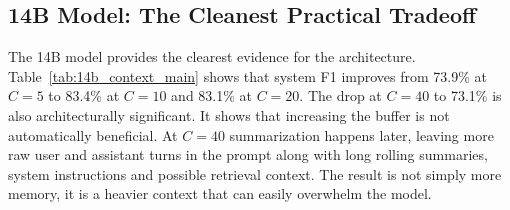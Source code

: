 \documentclass[pdflatex,sn-mathphys-num]{sn-jnl}%
\theoremstyle{thmstyleone}%
\theoremstyle{thmstyletwo}%
\theoremstyle{thmstylethree}%
\begin{document}
\subsection{14B Model: The Cleanest Practical Tradeoff}\label{subsec:results_14b}






The 14B model provides the clearest evidence for the architecture. Table~\ref{tab:14b_context_main} shows that system F1 improves from 73.9\% at $C=5$ to 83.4\% at $C=10$ and 83.1\% at $C=20$. The drop at $C=40$ to 73.1\% is also architecturally significant. It shows that increasing the buffer is not automatically beneficial. At $C=40$ summarization happens later, leaving more raw user and assistant turns in the prompt along with long rolling summaries, system instructions and possible retrieval context. The result is not simply more memory, it is a heavier context that can easily overwhelm the model.
\end{document}
